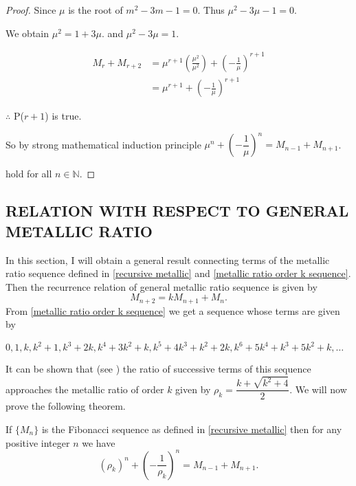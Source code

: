 \documentclass{rmutt-seminar}
\begin{document}
\begin{proof}
\quad \quad \quad Since $\mu$ is the root of $m^2 -3m -1 =0$. Thus $\mu^2-3\mu-1=0$.
 
\quad \quad \quad  We obtain $\mu^2=1+3\mu$. and $\mu^2-3\mu=1$.
 
 \begin{align*}
 M_{r} + M_{r+2} &= \mu^{r+1}\left(\frac{\mu^2}{\mu^2}\right)+\left(-\frac{1}{\mu}\right)^{r+1} \\
 &= \mu^{r+1}+\left(-\frac{1}{\mu}\right)^{r+1}
 \end{align*}	
 
 \quad \quad \quad $\therefore$ P($r+1$) is true.
 
 \quad \quad \quad So by strong mathematical induction principle $\mu^n + \left(-\dfrac{1}{\mu}\right)^n = M_{n-1} + M_{n+1}$. 
 
 \quad \quad \quad hold for all $n \in \mathbb{N}$.
\end{proof}

\begin{center}
\subsection*{RELATION WITH RESPECT TO GENERAL METALLIC RATIO}
\end{center}

In this section, I will obtain a general result connecting terms of the metallic ratio sequence defined in \eqref{recursive metallic} and 
\eqref{metallic ratio order k sequence}. Then the recurrence relation of general metallic ratio sequence is given by
\begin{equation*}
	 M_{n+2} =kM_{n+1}+M_n.
\end{equation*}  
From \eqref{metallic ratio order k sequence} we get a sequence whose terms are given by 
\begin{center}
	$0,1,k,k^2 + 1,k^3 + 2k,k^4 + 3k^2 + k, k^5 + 4k^3 + k^2 + 2k, k^6 + 5k^4 +k^3 + 5k^2 + k,\ldots$ 
\end{center}

It can be shown that (see \cite{R20}) the ratio of successive terms of this sequence approaches the metallic ratio of order $k$ given by $\rho_k = \dfrac{k+\sqrt{k^2+4}}{2}$. We 
will now prove the following theorem.
\begin{theorem}\label{metallic ratio theorem}
\textnormal{If} $\bigl\{ M_n \bigr\}$ \textnormal{is the Fibonacci sequence as defined in \eqref{recursive metallic} then for any positive integer} $ n $ \textnormal{we have} 
\begin{equation}\label{metallic ratio recursive}
	 (\rho_k )^n + \left(-\frac{1}{\rho_k }\right)^n = M_{n-1} + M_{n+1}. 
\end{equation}
\end{theorem}
\end{document}
